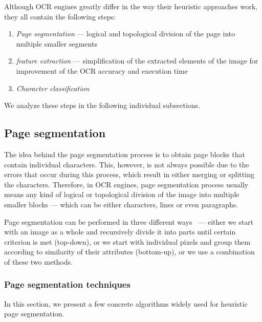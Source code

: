 Although OCR engines greatly differ in the way their heuristic approaches work, they all contain the following steps:
\begin{enumerate}
    \item \emph{Page segmentation} --- logical and topological division of the page into multiple smaller segments
    \item \emph{ feature extraction} --- simplification of the extracted elements of the image for improvement of the OCR accuracy and execution time
    \item \emph{Character classification}
\end{enumerate}

We analyze these steps in the following individual subsections.

\subsection{Page segmentation}

The idea behind the page segmentation process is to obtain page blocks that contain individual characters. This, however, is not always possible due to the errors that occur during this process, which result in either merging or splitting the characters. Therefore, in OCR engines, page segmentation process usually means any kind of logical or topological division of the image into multiple smaller blocks --- which can be either characters, lines or even paragraphs.

Page segmentation can be performed in three different ways~\citep{segmentationBenchmark} --- either we start with an image as a whole and recursively divide it into parts until certain criterion is met (top-down), or we start with individual pixels and group them according to similarity of their attributes (bottom-up), or we use a combination of these two methods.

\subsubsection{Page segmentation techniques}

In this section, we present a few concrete algorithms widely used for heuristic page segmentation.




